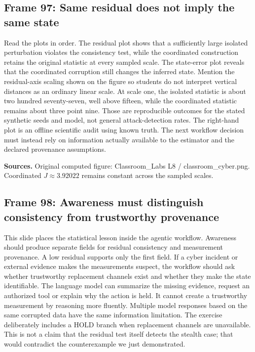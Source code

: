 \documentclass[11pt]{article}
\begin{document}
\subsection*{Frame 97: Same residual does not imply the same state}
Read the plots in order. The residual plot shows that a sufficiently large isolated perturbation violates the consistency test, while the coordinated construction retains the original statistic at every sampled scale. The state-error plot reveals that the coordinated corruption still changes the inferred state. Mention the residual-axis scaling shown on the figure so students do not interpret vertical distances as an ordinary linear scale. At scale one, the isolated statistic is about two hundred seventy-seven, well above fifteen, while the coordinated statistic remains about three point nine. Those are reproducible outcomes for the stated synthetic seeds and model, not general attack-detection rates. The right-hand plot is an offline scientific audit using known truth. The next workflow decision must instead rely on information actually available to the estimator and the declared provenance assumptions.\par
\par\nopagebreak\begin{minipage}{\linewidth}{\footnotesize\color{slate}\textbf{Sources.} Original computed figure: Classroom\_Labs L8 / classroom\_cyber.png. Coordinated $J\approx3.92022$ remains constant across the sampled scales.\par}\end{minipage}\par\medskip
\subsection*{Frame 98: Awareness must distinguish consistency from trustworthy provenance}
This slide places the statistical lesson inside the agentic workflow. Awareness should produce separate fields for residual consistency and measurement provenance. A low residual supports only the first field. If a cyber incident or external evidence makes the measurements suspect, the workflow should ask whether trustworthy replacement channels exist and whether they make the state identifiable. The language model can summarize the missing evidence, request an authorized tool or explain why the action is held. It cannot create a trustworthy measurement by reasoning more fluently. Multiple model responses based on the same corrupted data have the same information limitation. The exercise deliberately includes a HOLD branch when replacement channels are unavailable. This is not a claim that the residual test itself detects the stealth case; that would contradict the counterexample we just demonstrated.\par
\end{document}
